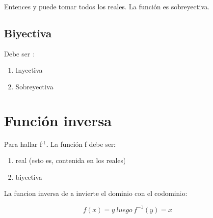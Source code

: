\documentclass[11pt]{article}
\begin{document}
Entences y puede tomar todos los reales. 
La función es sobreyectiva.

\subsection{Biyectiva}
\label{sec-1-4}
Debe ser :
\begin{enumerate}
\item Inyectiva
\item Sobreyectiva
\end{enumerate}

\section{Función inversa}
\label{sec-2}

Para hallar f$^{\text{-1}}$. La función f debe ser:
\begin{enumerate}
\item real (esto es, contenida en los reales)
\item biyectiva
\end{enumerate}

La funcion inversa de a invierte el dominio con el codominio:

\[f(x) = y \ luego\ f^{-1}(y)= x\]
\end{document}

